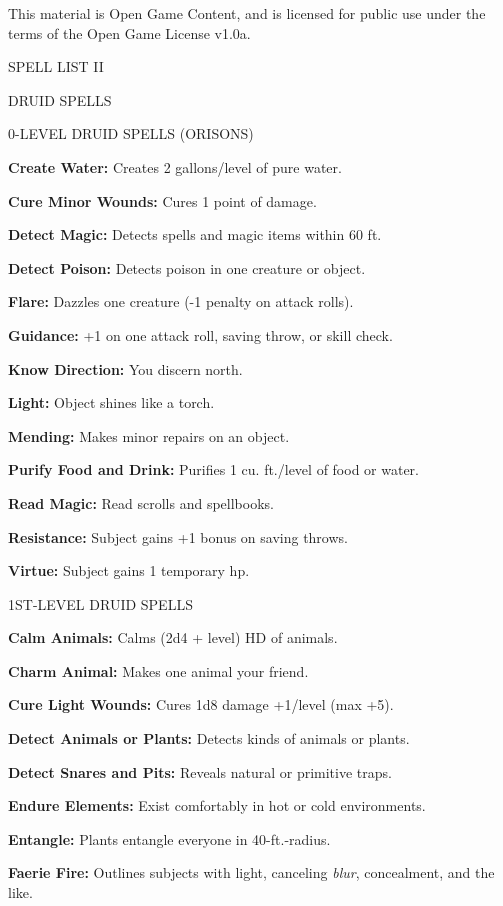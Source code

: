 \documentclass{article}
\begin{document}
This material is Open Game Content, and is licensed for public use under the terms 
of the Open Game License v1.0a.

{\LARGE{}SPELL LIST II}

\vspace{12pt}
{\LARGE{}DRUID SPELLS}

0-LEVEL DRUID SPELLS (ORISONS)

\textbf{Create Water:} Creates 2 gallons/level of pure water.

\textbf{Cure Minor Wounds:} Cures 1 point of damage.

\textbf{Detect Magic:} Detects spells and magic items within 60 ft.

\textbf{Detect Poison:} Detects poison in one creature or object.

\textbf{Flare:} Dazzles one creature (-1 penalty on attack rolls).

\textbf{Guidance:} +1 on one attack roll, saving throw, or skill check.

\textbf{Know Direction:} You discern north.

\textbf{Light:} Object shines like a torch.

\textbf{Mending:} Makes minor repairs on an object.

\textbf{Purify Food and Drink:} Purifies 1 cu. ft./level of food or water.

\textbf{Read Magic:} Read scrolls and spellbooks.

\textbf{Resistance:} Subject gains +1 bonus on saving throws.

\textbf{Virtue:} Subject gains 1 temporary hp.

1ST-LEVEL DRUID SPELLS

\textbf{Calm Animals:} Calms (2d4 + level) HD of animals.

\textbf{Charm Animal:} Makes one animal your friend.

\textbf{Cure Light Wounds:} Cures 1d8 damage +1/level (max +5).

\textbf{Detect Animals or Plants:} Detects kinds of animals or plants.

\textbf{Detect Snares and Pits:} Reveals natural or primitive traps.

\textbf{Endure Elements:} Exist comfortably in hot or cold environments.

\textbf{Entangle:} Plants entangle everyone in 40-ft.-radius.

\textbf{Faerie Fire:} Outlines subjects with light, canceling \textit{blur}, concealment, 
and the like.
\end{document}
